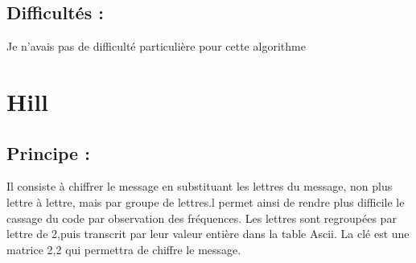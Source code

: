 \documentclass{article}
\begin{document}
\subsection{Difficultés :}
Je n'avais pas de difficulté particulière pour cette algorithme

\section{Hill}
\subsection{Principe :}
Il consiste à chiffrer le message en substituant les lettres du message, non plus lettre à lettre, mais par groupe de lettres.l permet ainsi de rendre plus difficile le cassage du code par observation des fréquences.
Les lettres sont regroupées par lettre de 2,puis transcrit par leur valeur entière dans la table Ascii. La clé est une matrice 2,2 qui permettra de chiffre le message.
\end{document}

